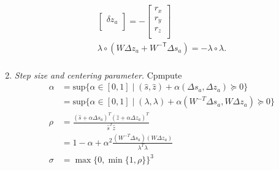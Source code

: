 \begin{enumerate}
\begin{equation}
\begin{aligned}
\begin{bmatrix}
    			\delta z_a\\
    		\end{bmatrix}
    		=-
    		\begin{bmatrix}
    			r_x\\
    			r_y\\
    			r_z\\
    		\end{bmatrix}
    		\\
    		\lambda\circ(W\Delta {z_a} +W^{-\mathsf{T}}\Delta s_a ) = -\lambda \circ \lambda.\\
    	\end{aligned}
    	\label{eqn:cvxopt_algorithm_2}
    \end{equation}
    
    
    \item \textit{Step size and centering parameter.} Cpmpute\\
    	\begin{equation*}
    		\begin{aligned}
    			\alpha &= \textrm{sup} \lbrace \alpha \in[0,1] \mid (\hat{s},\hat{z})+\alpha(\Delta s_a,\Delta z_a)\succeq 0\rbrace \\
    			&= \textrm{sup} \lbrace \alpha \in[0,1]  \mid (\lambda,\lambda)+\alpha ( W^{-T} \Delta s_a, W\Delta z_a)\succeq 0 \rbrace \\
    			\rho &= \frac{(\hat{s}+\alpha \Delta s_a)^T (\hat{z}+\alpha \Delta z_a)^T} {\hat{s}^T\hat{z}}\\
    				&= 1-\alpha+\alpha^2\frac{(W^{-T} \Delta s_a)(W\Delta z_a)}{\lambda^{T}\lambda} \\
    			\sigma &= \max{\lbrace 0,\min{\lbrace 1,\rho \rbrace} \rbrace }^3\\
    		\end{aligned}
    	\end{equation*}
    

\end{enumerate}
